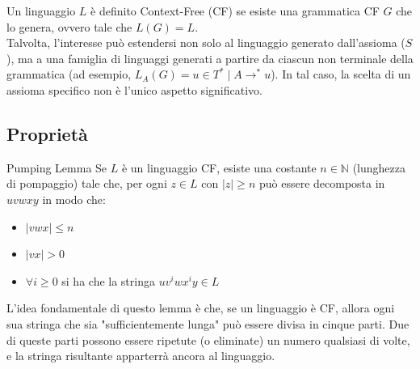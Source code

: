 \documentclass[12pt, a4paper]{report}
\begin{document}
            Un linguaggio $L$ è definito Context-Free (CF) se esiste una grammatica CF $G$ che lo genera, ovvero tale che $L(G) = L$.\\
            Talvolta, l'interesse può estendersi non solo al linguaggio generato dall'assioma ($S$), ma a una famiglia di linguaggi generati a partire da ciascun non terminale della grammatica (ad esempio, $L_A(G) = {u \in T^* \mid A \rightarrow^* u}$). In tal caso, la scelta di un assioma specifico non è l'unico aspetto significativo.
        \subsection{Proprietà}
            \begin{definitionbox}{Pumping Lemma}{}
                Se $L$ è un linguaggio CF, esiste una costante $n\in\mathbb{N}$ (lunghezza di pompaggio) tale che, per ogni $z\in L$ con $|z|\geq n$ può essere decomposta in $uvwxy$ in modo che:
                \begin{itemize}
                    \item $|vwx|\leq n$
                    \item $|vx|>0$
                    \item $\forall i\geq 0$ si ha che la stringa $uv^iwx^iy\in L$
                \end{itemize} 
            \end{definitionbox}
            L'idea fondamentale di questo lemma è che, se un linguaggio è CF, allora ogni sua stringa che sia "sufficientemente lunga" può essere divisa in cinque parti. Due di queste parti possono essere ripetute (o eliminate) un numero qualsiasi di volte, e la stringa risultante apparterrà ancora al linguaggio.
\end{document}
